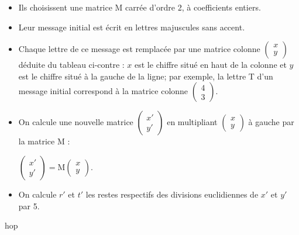 \parbox{0.53\linewidth}{
\begin{itemize}
\item Ils choisissent une matrice M carrée d'ordre 2, à coefficients entiers.
\item Leur message initial est écrit en lettres majuscules sans accent.
\item Chaque lettre de ce message est remplacée par une matrice colonne $\begin{pmatrix} x\\y \end{pmatrix}$ déduite du tableau ci-contre : $x$ est le chiffre situé en haut de la colonne et $y$ est le chiffre situé à la gauche de la ligne; par exemple, la lettre \textsf{T} d'un message initial correspond à la matrice colonne $\begin{pmatrix} 4\\3 \end{pmatrix}$.
\item On calcule une nouvelle matrice $\begin{pmatrix} x'\\y' \end{pmatrix}$ en multipliant $\begin{pmatrix} x\\y \end{pmatrix}$ à gauche par la matrice M : 
	
$\begin{pmatrix} x'\\y' \end{pmatrix} = \text{M} \begin{pmatrix} x\\y \end{pmatrix}$.	
	\item On calcule $r'$ et $t'$ les restes respectifs des divisions euclidiennes de $x'$ et $y'$ par 5. 
\end{itemize}} \hfill

hop\begin{definition}

\end{definition}